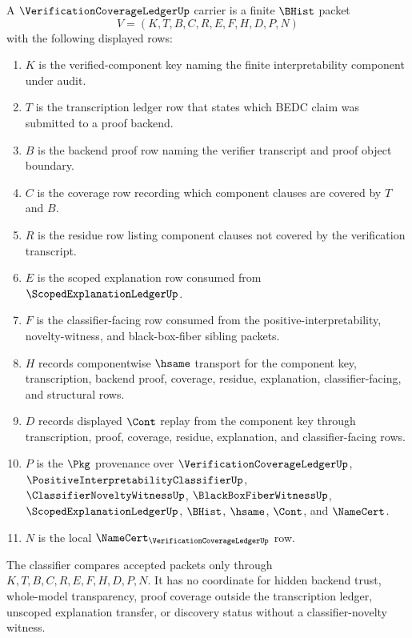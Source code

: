 \begin{definition}
\label{def:verification-coverage-ledger-carrier}
A $\VerificationCoverageLedgerUp$ carrier is a finite $\BHist$ packet
$$
V=(K,T,B,C,R,E,F,H,D,P,N)
$$
with the following displayed rows:
\begin{enumerate}
\item $K$ is the verified-component key naming the finite interpretability component under audit.
\item $T$ is the transcription ledger row that states which BEDC claim was submitted to a proof backend.
\item $B$ is the backend proof row naming the verifier transcript and proof object boundary.
\item $C$ is the coverage row recording which component clauses are covered by $T$ and $B$.
\item $R$ is the residue row listing component clauses not covered by the verification transcript.
\item $E$ is the scoped explanation row consumed from $\ScopedExplanationLedgerUp$.
\item $F$ is the classifier-facing row consumed from the positive-interpretability, novelty-witness, and black-box-fiber sibling packets.
\item $H$ records componentwise $\hsame$ transport for the component key, transcription, backend proof, coverage, residue, explanation, classifier-facing, and structural rows.
\item $D$ records displayed $\Cont$ replay from the component key through transcription, proof, coverage, residue, explanation, and classifier-facing rows.
\item $P$ is the $\Pkg$ provenance over $\VerificationCoverageLedgerUp$, $\PositiveInterpretabilityClassifierUp$, $\ClassifierNoveltyWitnessUp$, $\BlackBoxFiberWitnessUp$, $\ScopedExplanationLedgerUp$, $\BHist$, $\hsame$, $\Cont$, and $\NameCert$.
\item $N$ is the local $\NameCert_{\VerificationCoverageLedgerUp}$ row.
\end{enumerate}
The classifier compares accepted packets only through $K,T,B,C,R,E,F,H,D,P,N$. It has no coordinate for hidden backend trust, whole-model transparency, proof coverage outside the transcription ledger, unscoped explanation transfer, or discovery status without a classifier-novelty witness.
\end{definition}

